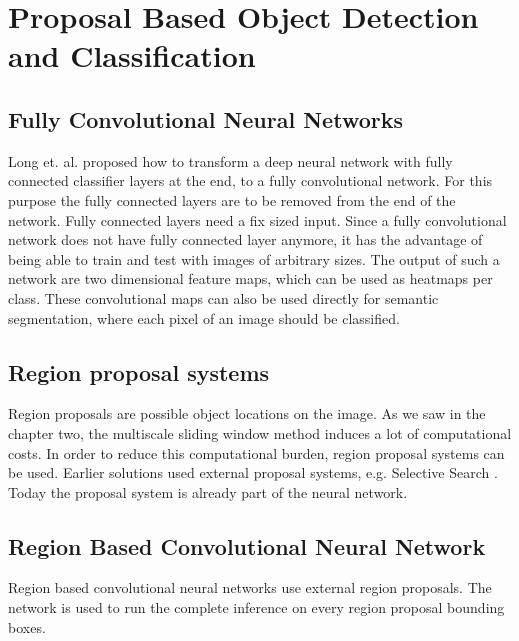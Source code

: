 \chapter{Proposal Based Object Detection and Classification}

\section{Fully Convolutional Neural Networks}
Long et. al. proposed \cite{DBLP:journals/corr/LongSD14} how to transform a deep neural network with fully connected classifier layers at the end, to a fully convolutional network. For this purpose the fully connected layers are to be removed from the end of the network.
Fully connected layers need a fix sized input. Since a fully convolutional network does not have fully connected layer anymore, it has the advantage of being able to train and test with images of arbitrary sizes.
The output of such a network are two dimensional feature maps, which can be used as heatmaps per class. These convolutional maps can also be used directly for semantic segmentation, where each pixel of an image should be classified.

\section{Region proposal systems}
Region proposals are possible object locations on the image. As we saw in the chapter two, the multiscale sliding window method induces a lot of computational costs. In order to reduce this computational burden, region proposal systems can be used. Earlier solutions used external proposal systems, e.g. Selective Search \cite{Uijlings13}. Today the proposal system is already part of the neural network.

\section{Region Based Convolutional Neural Network}
Region based convolutional neural networks use external region proposals. The network is used to run the complete inference on every region proposal bounding boxes. 

